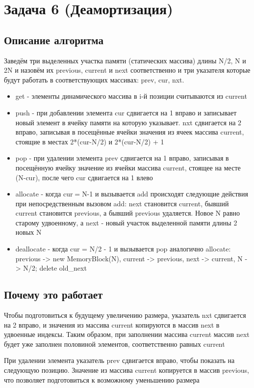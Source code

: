 \documentclass[a4paper,14pt]{article}
\begin{document}
\section{Задача 6 (Деамортизация)}
\subsection{Описание алгоритма}
Заведём три выделенных участка памяти (статических массива) длины N/2, N и 2N
и назовём их previous, current и next соответственно и три указателя которые будут работать в соответствующих массивах: prev, cur, nxt.

\begin{itemize}
    \item get - элементы динамического массива в i-й позиции считываются из current
    \item push - при добавлении элемента cur сдвигается на 1 вправо и записывает новый элемент в ячейку памяти на которую указывает. nxt сдвигается на 2 вправо, записывая в посещённые ячейки значения из ячеек массива current, стоящие в местах 2*(cur-N/2) и 2*(cur-N/2) + 1
    \item pop - при удалении элемента prev сдвигается на 1 вправо, записывая в посещённую ячейку значение из ячейки массива current, стоящее на месте (N-cur), после чего cur сдвигается на 1 влево
    \item allocate - когда cur$ = $N-1 и вызывается add происходят следующие действия при непосредственным вызовом add: next становится current, бывший current становится previous, а бывший previous удаляется. Новое N равно старому удвоенному, а next - новый участок выделенной памяти длины 2 новых N
    \item deallocate - когда cur = N/2 - 1 и вызывается pop аналогично allocate: previous -> new MemoryBlock(N), current -> previous, next -> current, N -> N/2; delete old\_next
\end{itemize}

\subsection{Почему это работает}
Чтобы подготовиться к будущему увеличению размера, указатель nxt сдвигается на 2 вправо, и значения из массива current копируются в массив next в удвоенные индексы. Таким образом, при заполнении массива current массив next будет уже заполнен половиной элементов, соответственно равных current

При удалении элемента указатель prev сдвигается вправо, чтобы показать на следующую позицию. Значение из массива current копируется в массив previous, что позволяет подготовиться к возможному уменьшению размера
\end{document}
